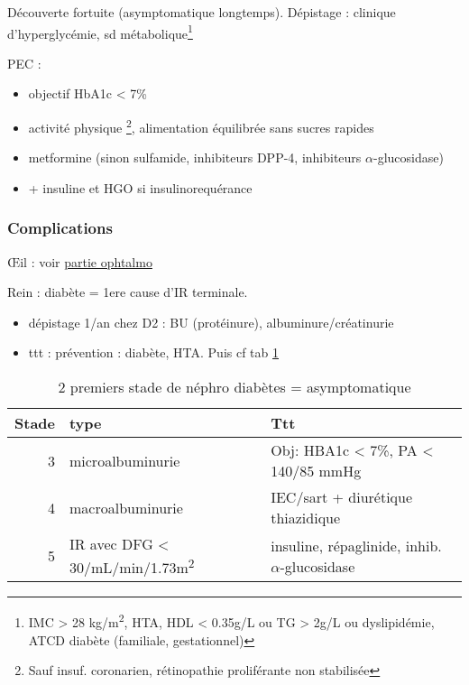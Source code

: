 \documentclass[11pt]{article}
\begin{document}
Découverte fortuite (asymptomatique longtemps). 
Dépistage : clinique d'hyperglycémie, sd métabolique\footnote{IMC > 28 kg/m\textsuperscript{2}, HTA, HDL < 0.35g/L ou TG > 2g/L ou dyslipidémie, ATCD
diabète (familiale, gestationnel)}

PEC :
\begin{itemize}
\item objectif HbA1c < 7\%
\item activité physique \footnote{Sauf insuf. coronarien, rétinopathie proliférante non stabilisée}, alimentation équilibrée sans sucres rapides
\item metformine (sinon sulfamide, inhibiteurs DPP-4, inhibiteurs
\(\alpha\)-glucosidase)
\item + insuline et HGO si insulinorequérance
\end{itemize}

\subsubsection{Complications}
\label{sec:orgfe90cd1}
\OE{}il : voir \hyperref[orgc28cb24]{partie ophtalmo}

Rein : diabète = 1ere cause d'IR terminale. 
\begin{itemize}
\item dépistage 1/an chez D2 : BU (protéinure), albuminure/créatinurie
\item ttt : prévention : diabète, HTA. Puis cf tab \ref{tab:org940e1d4}
\end{itemize}
\begin{table}[htbp]
\caption{\label{tab:org940e1d4}2 premiers stade de néphro diabètes = asymptomatique}
\centering
\begin{tabular}{rll}
Stade & type & Ttt\\
\hline
3 & microalbuminurie & Obj: HBA1c < 7\%, PA < 140/85 mmHg\\
4 & macroalbuminurie & IEC/sart + diurétique thiazidique\\
5 & IR avec DFG < 30/mL/min/1.73m\textsuperscript{2} & insuline, répaglinide, inhib. \(\alpha\)-glucosidase\\
\end{tabular}
\end{table}
\end{document}
